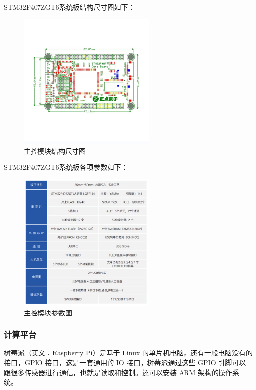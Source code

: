 \documentclass[10pt]{ctexart}
\begin{document}
STM32F407ZGT6系统板结构尺寸图如下：

\begin{figure}[H]
    \centering
    \includegraphics[width=0.6\textwidth]{control/control_parameter1.png}
    \caption{主控模块结构尺寸图}
    \label{fig:control_parameter1}
\end{figure}

STM32F407ZGT6系统板各项参数如下：

\begin{figure}[H]
    \centering
    \includegraphics[width=0.6\textwidth]{control/control_parameter2.png}
    \caption{主控模块参数图}
    \label{fig:control_parameter2}
\end{figure}

\subsubsection{计算平台}
树莓派（英文：Raspberry Pi）是基于 Linux 的单片机电脑，还有一般电脑没有的接口，GPIO 接口，这是一套通用的 IO 接口，树莓派通过这些 GPIO 引脚可以跟很多传感器进行通信，也就是读取和控制。还可以安装 ARM 架构的操作系统。
\end{document}
